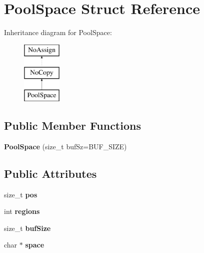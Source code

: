 \hypertarget{structPoolSpace}{}\section{Pool\+Space Struct Reference}
\label{structPoolSpace}
Inheritance diagram for Pool\+Space\+:\begin{figure}[H]
\begin{center}
\leavevmode
\includegraphics[height=3.000000cm]{structPoolSpace}
\end{center}
\end{figure}
\subsection*{Public Member Functions}
\begin{DoxyCompactItemize}
\item 
\hypertarget{structPoolSpace_a5a1aa11a619480e12d34dbb3f203bc99}{}{\bfseries Pool\+Space} (size\+\_\+t buf\+Sz=B\+U\+F\+\_\+\+S\+I\+Z\+E)\label{structPoolSpace_a5a1aa11a619480e12d34dbb3f203bc99}

\end{DoxyCompactItemize}
\subsection*{Public Attributes}
\begin{DoxyCompactItemize}
\item 
\hypertarget{structPoolSpace_a2e50872fcfd918e4e37ef8d50a678665}{}size\+\_\+t {\bfseries pos}\label{structPoolSpace_a2e50872fcfd918e4e37ef8d50a678665}

\item 
\hypertarget{structPoolSpace_ab5619e13801a6ced4aeec2d26147b2af}{}int {\bfseries regions}\label{structPoolSpace_ab5619e13801a6ced4aeec2d26147b2af}

\item 
\hypertarget{structPoolSpace_a950835cc288be345cde368cc0b05831f}{}size\+\_\+t {\bfseries buf\+Size}\label{structPoolSpace_a950835cc288be345cde368cc0b05831f}

\item 
\hypertarget{structPoolSpace_a8d935ab167f1f4d3e83c3b45764d0de1}{}char $\ast$ {\bfseries space}\label{structPoolSpace_a8d935ab167f1f4d3e83c3b45764d0de1}

\end{DoxyCompactItemize}
